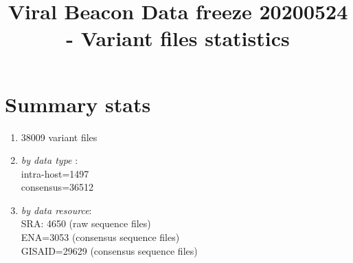 \documentclass[a4paper, 10pt]{article}        %
\title{Viral Beacon Data freeze 20200524 - Variant files statistics}
\begin{document}
\date{}
\maketitle


\section{Summary stats}

\begin{enumerate}

\item  38009 variant files %




\item[] \textsl{by data type} : \\
intra-host=1497 \\
consensus=36512\\


\item[] \textsl{by data resource}: \\
SRA: 4650 (raw sequence files) \\
ENA=3053 (consensus sequence files)\\
GISAID=29629 (consensus sequence files)


\end{enumerate}
\end{document}
